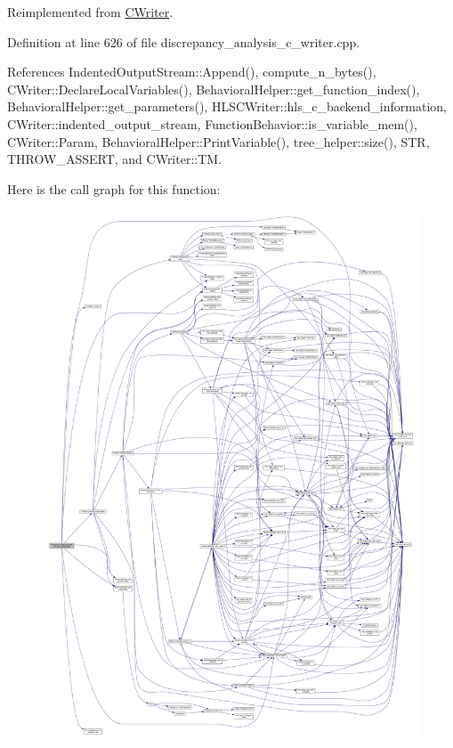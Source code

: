 Reimplemented from \hyperlink{classCWriter_ab269f8330141bcdeecda80a23e60c8f5}{C\+Writer}.



Definition at line 626 of file discrepancy\+\_\+analysis\+\_\+c\+\_\+writer.\+cpp.



References Indented\+Output\+Stream\+::\+Append(), compute\+\_\+n\+\_\+bytes(), C\+Writer\+::\+Declare\+Local\+Variables(), Behavioral\+Helper\+::get\+\_\+function\+\_\+index(), Behavioral\+Helper\+::get\+\_\+parameters(), H\+L\+S\+C\+Writer\+::hls\+\_\+c\+\_\+backend\+\_\+information, C\+Writer\+::indented\+\_\+output\+\_\+stream, Function\+Behavior\+::is\+\_\+variable\+\_\+mem(), C\+Writer\+::\+Param, Behavioral\+Helper\+::\+Print\+Variable(), tree\+\_\+helper\+::size(), S\+TR, T\+H\+R\+O\+W\+\_\+\+A\+S\+S\+E\+RT, and C\+Writer\+::\+TM.

Here is the call graph for this function\+:
\nopagebreak
\begin{figure}[H]
\begin{center}
\leavevmode
\includegraphics[width=350pt]{d4/d5c/classDiscrepancyAnalysisCWriter_af877ad0ea844b3dd8da2c8e9a2756986_cgraph}
\end{center}
\end{figure}
\mbox{\label{classDiscrepancyAnalysisCWriter_aa06e1b8c2dedbdb1278f61c7970ebc62}} 
